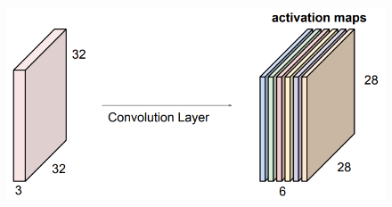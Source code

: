   \begin{figure}[H]
    \centering 
    \includegraphics[scale=0.35]{img/03_CNN/kernel3.png}
    \caption{} 
    \label{fig:kernel3}
  \end{figure}

